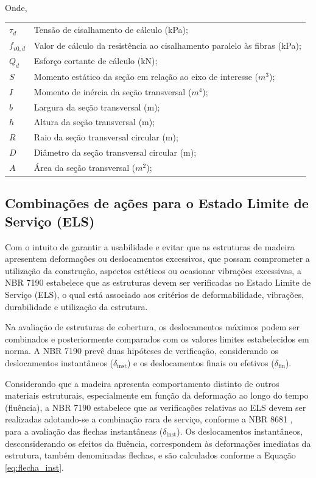 \begin{quadro}[htpb!]
Onde,

\begin{tabular}{ll}
$\tau_d$ & Tensão de cisalhamento de cálculo (kPa); \\
$f_{v0,d}$ & Valor de cálculo da resistência ao cisalhamento paralelo às fibras (kPa); \\
$Q_d$ & Esforço cortante de cálculo (kN); \\
$S$ & Momento estático da seção em relação ao eixo de interesse ($m^3$); \\
$I$ & Momento de inércia da seção transversal ($m^4$); \\
$b$ & Largura da seção transversal (m); \\
$h$ & Altura da seção transversal (m); \\
$R$ & Raio da seção transversal circular (m); \\
$D$ & Diâmetro da seção transversal circular (m); \\
$A$ & Área da seção transversal ($m^2$); \\
\end{tabular}

\subsection{Combinações de ações para o Estado Limite de Serviço (ELS)}

Com o intuito de garantir a usabilidade e evitar que as estruturas de madeira apresentem deformações ou deslocamentos excessivos, que possam comprometer a utilização da construção, aspectos estéticos ou ocasionar vibrações excessivas, a NBR 7190 \parencite{NBR7190-1:2022} estabelece que as estruturas devem ser verificadas no Estado Limite de Serviço (ELS), o qual está associado aos critérios de deformabilidade, vibrações, durabilidade e utilização da estrutura.

Na avaliação de estruturas de cobertura, os deslocamentos máximos podem ser combinados e posteriormente comparados com os valores limites estabelecidos em norma. A NBR 7190 \parencite{NBR7190-1:2022} prevê duas hipóteses de verificação, considerando os deslocamentos instantâneos ($\delta_{\mathrm{inst}}$) e os deslocamentos finais ou efetivos ($\delta_{\mathrm{fin}}$).

Considerando que a madeira apresenta comportamento distinto de outros materiais estruturais, especialmente em função da deformação ao longo do tempo (fluência), a NBR 7190 \parencite{NBR7190-1:2022} estabelece que as verificações relativas ao ELS devem ser realizadas adotando-se a combinação rara de serviço, conforme a NBR 8681 \parencite{NBR8681:2025}, para a avaliação das flechas instantâneas ($\delta_{\mathrm{inst}}$). Os deslocamentos instantâneos, desconsiderando os efeitos da fluência, correspondem às deformações imediatas da estrutura, também denominadas flechas, e são calculados conforme a Equação \eqref{eq:flecha_inst}.


\end{quadro}
